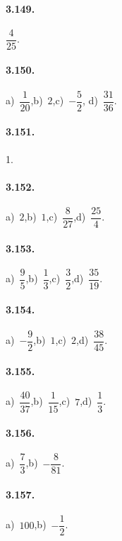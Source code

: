 \begin{multicols}{2}
\paragraph{3.149.}
$\dfrac{4}{25}$.

\paragraph{3.150.}
a)~$\dfrac{1}{20}$,\quad b)~$2$,\quad c)~$-\dfrac{5}{2}$,\quad %
d)~$\dfrac{31}{36}$.

\paragraph{3.151.}1.

\paragraph{3.152.}
a)~$2$,\quad b)~$1$,\quad c)~$\dfrac{8}{27}$,\quad d)~$\dfrac{25}{4}$.

\paragraph{3.153.}
a)~$\dfrac{9}{5}$,\quad b)~$\dfrac{1}{3}$,\quad c)~$\dfrac{3}{2}$,\quad d)~$\dfrac{35}{19}$.

\paragraph{3.154.}
a)~$-\dfrac{9}{2}$,\quad b)~$1$,\quad c)~$2$,\quad d)~$\dfrac{38}{45}$.

\paragraph{3.155.}
a)~$\dfrac{40}{37}$,\quad b)~$\dfrac{1}{15}$,\quad c)~$7$,\quad d)~$\dfrac{1}{3}$.

\paragraph{3.156.}
a)~$\dfrac{7}{3}$,\quad b)~$-\dfrac{8}{81}$.

\paragraph{3.157.}
a)~$100$,\quad b)~$-\dfrac{1}{2}$.



\end{multicols}
